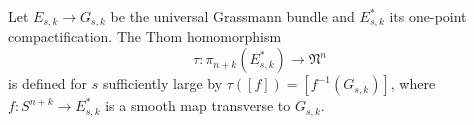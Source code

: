 Let $E_{s,k} \to G_{s,k}$ be the universal Grassmann bundle and $E^*_{s,k}$ its one-point compactification. The Thom homomorphism
$$\tau: \pi_{n+k}(E^*_{s,k}) \to \mathfrak{N}^n$$
is defined for $s$ sufficiently large by $\tau([f]) = [f^{-1}(G_{s,k})]$, where $f: S^{n+k} \to E^*_{s,k}$ is a smooth map transverse to $G_{s,k}$.
